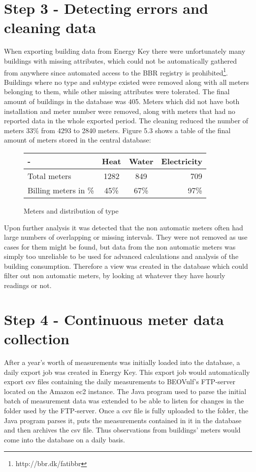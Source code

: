 \section*{Step 3 - Detecting errors and cleaning data}
When exporting building data from Energy Key there were unfortunately many buildings with missing attributes, which could not be automatically gathered from anywhere since automated access to the BBR registry is prohibited\footnote{http://bbr.dk/fatibbr}.  Buildings where no type and subtype existed were removed along with all meters belonging to them, while other missing attributes were tolerated. The final amount of buildings in the database was 405. Meters which did not have both installation and meter number were removed, along with meters that had no reported data in the whole exported period. The cleaning reduced the number of meters 33\% from 4293 to 2840 meters. Figure 5.3 shows a table of the final amount of meters stored in the central database:
\begin{figure}
\begin{center}
\begin{tabular}{| l | c | c | r |}
\hline 
  - & Heat & Water & Electricity \\ \hline 
  Total meters & 1282 & 849 & 709 \\ \hline 
  Billing meters in \% & 45\% & 67\% & 97\% \\ \hline
\end{tabular}
\end{center}
\caption{Meters and distribution of type}
\end{figure}

Upon further analysis it was detected that the non automatic meters often had large numbers of overlapping or missing intervals. They were not removed as use cases for them might be found, but data from the non automatic meters was simply too unreliable to be used for advanced calculations and analysis of the building consumption. Therefore a view was created in the database which could filter out non automatic meters, by looking at whatever they have hourly readings or not.
\section*{Step 4 - Continuous meter data collection}
After a year's worth of measurements was initially loaded into the database, a daily export job was created in Energy Key. This export job would automatically export csv files containing the daily measurements to BEOVulf’s FTP-server located on the Amazon ec2 instance. The Java program used to parse the initial batch of measurement data was extended to be able to listen for changes in the folder used by the FTP-server. Once a csv file is fully uploaded to the folder, the Java program parses it, puts the measurements contained in it in the database and then archives the csv file. Thus observations from buildings’ meters would come into the database on a daily basis.
